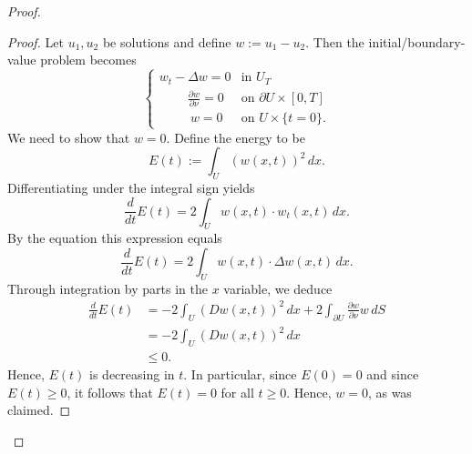 \documentclass{article}
\begin{document}
\begin{flushleft}
\begin{proof}
\begin{proof}
Let $u_1,u_2$ be solutions and define $w:=u_1-u_2$. Then the initial/boundary-value problem becomes
\[
  \begin{cases} 
      w_t-\Delta w=0 & \text{in $U_T$} \\
      ~\qquad\frac{\partial w}{\partial \nu}=0 & \text{on $\partial U\times[0,T]$} \\
      ~~\qquad w = 0 & \text{on $U\times \{t=0\}$.}
   \end{cases}
\]
We need to show that $w=0$. Define the energy to be
$$E(t):= \int_U \left(w(x,t)\right)^2 \,dx.$$
Differentiating under the integral sign yields
$$\frac{d}{dt}E(t)=2\int_U w(x,t)\cdot w_t(x,t)\,dx.$$
By the equation this expression equals
$$\frac{d}{dt}E(t)=2\int_U w(x,t)\cdot \Delta w(x,t)\,dx.$$
Through integration by parts in the $x$ variable, we deduce
\begin{align*}\frac{d}{dt}E(t)&=-2\int_U \left(Dw(x,t)\right)^2\,dx + 2\int_{\partial U} \frac{\partial w}{\partial \nu} w\,dS\\&=
-2\int_U \left(Dw(x,t)\right)^2\,dx \\& \le 0.
\end{align*}
Hence, $E(t)$ is decreasing in $t$.  In particular,  since $E(0) = 0$ and since $E(t)\ge 0$,  it follows that $E(t) = 0$ for all $t\ge 0$.  Hence, $w= 0$, as was claimed.
\end{proof}

\end{proof}
\end{flushleft}
\end{document}
